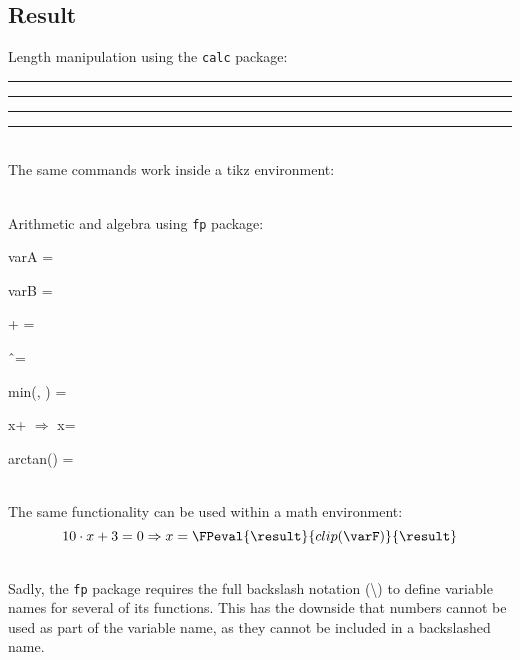 \documentclass{article}
\newlength{\mylength}
\newlength{\myotherlength}
\newlength{\templength}
\newcommand\FPuse[1]{\FPeval{\result}{#1}{\result}} %
\begin{document}
\subsection*{Result}
Length manipulation using the \verb|calc| package:

\setlength{\mylength}{\textwidth}
\setlength{\myotherlength}{3cm}

\rule{\mylength}{5pt}

\setlength{\templength}{\mylength-\myotherlength}
\rule{\templength}{5pt}

\setlength{\templength}{\mylength-\myotherlength*2}
\rule{\templength}{5pt}

\rule{\templength}{5pt}

~\\
The same commands work inside a tikz environment:\\

~\\
Arithmetic and algebra using \verb|fp| package:

varA = \varA

varB = \varB

\varA + \varB = \varC

\varA \^\ \varB = \varD

\FPmin{\varE}{\varA}{\varB}
min(\varA, \varB) = \varE

\FPlsolve{\varF}{\varA}{\varB}
\varA*x+ $\Rightarrow$ x=\FPuse{clip(\varF)}

arctan(\varA) = \FPuse{round(\varG,3)}

~\\
The same functionality can be used within a math environment:
\begin{equation}
10\cdot x + 3 = 0 \Rightarrow x=\FPuse{clip(\varF)}
\end{equation}

~\\
Sadly, the \verb|fp| package requires the full backslash notation (\textbackslash) to define variable names for several of its functions. This has the downside that numbers cannot be used as part of the variable name, as they cannot be included in a backslashed name.
\end{document}
